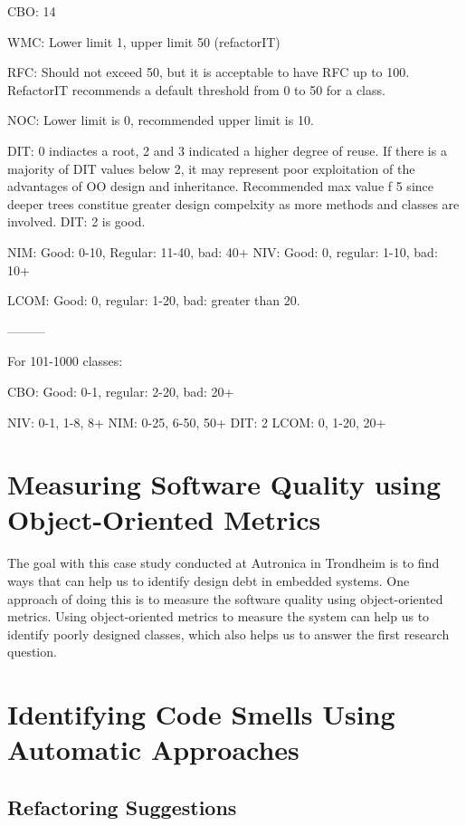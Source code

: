 CBO: 14

WMC: Lower limit 1, upper limit 50 (refactorIT)

RFC: Should not exceed 50, but it is acceptable to have RFC up to 100. RefactorIT recommends a default threshold from 0 to 50 for a class. 

NOC: Lower limit is 0, recommended upper limit is 10.

DIT: 0 indiactes a root, 2 and 3 indicated a higher degree of reuse. If there is a majority of DIT values 
below 2, it may represent poor exploitation of the advantages of OO design and inheritance. Recommended max value f 5 since deeper trees constitue greater design compelxity as more methods and classes are involved. DIT: 2 is good. 

NIM: Good: 0-10, Regular: 11-40, bad: 40+
NIV: Good: 0, regular: 1-10, bad: 10+

LCOM: Good: 0, regular: 1-20, bad: greater than 20. 

---------

For 101-1000 classes:

CBO: Good: 0-1, regular: 2-20, bad: 20+

NIV: 0-1, 1-8, 8+
NIM: 0-25, 6-50, 50+
DIT: 2
LCOM: 0, 1-20, 20+





\section{Measuring Software Quality using Object-Oriented Metrics}
The goal with this case study conducted at Autronica in Trondheim is to find ways that can help us to identify design debt in embedded systems. One approach of doing this is to measure the software quality using object-oriented metrics. Using object-oriented metrics to measure the system can help us to identify poorly designed classes, which also helps us to answer the first research question.

\section{Identifying Code Smells Using Automatic Approaches}



\subsection{Refactoring Suggestions}



